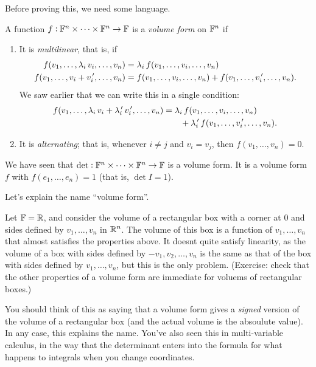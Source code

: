 Before proving this, we need some language.

\begin{definition}
	A function $f:\mathbb{F}^n\times\cdots\times\mathbb{F}^n\to\mathbb{F}$ is a \emph{volume form} on $\mathbb{F}^n$ if
	\begin{enumerate}
		\item It is \emph{multilinear}, that is, if
		\begin{align*}
			f(v_1,\ldots,\lambda_i\,v_i,\ldots,v_n)
			&= \lambda_i\,f(v_1,\ldots,v_i,\ldots,v_n) \\
			f(v_1,\ldots,v_i+v_i^{\,\prime},\ldots,v_n)
			&= f(v_1,\ldots,v_i,\ldots,v_n)
			 + f(v_1,\ldots,v_i^{\,\prime},\ldots,v_n).
		\end{align*}
		We saw earlier that we can write this in a single condition:
		\begin{align*}
			f(v_1,\ldots,\lambda_i\,v_i + \lambda_i\p\,v_i\p,\ldots,v_n)
			&= \lambda_i\,f(v_1,\ldots,v_i,\ldots,v_n) \\
			&\qquad + \lambda_i\p \, f(v_1,\ldots,v_i\p,\ldots,v_n). %
		\end{align*}
		
		\item It is \emph{alternating}; that is, whenever $i\neq j$ and $v_i=v_j$, then $f(v_1,\ldots,v_n)=0$. %
	\end{enumerate}
\end{definition}

\begin{example}
	We have seen that $\det:\mathbb{F}^n\times\cdots\times\mathbb{F}^n \to \mathbb{F}$ is a volume form. It is a volume form $f$ with $f(e_1,\ldots,e_n)=1$ (that is, $\det I=1$). %
\end{example}

\begin{remark}
	Let's explain the name ``volume form''.

	Let $\mathbb{F} = \mathbb{R}$, and consider the volume of a rectangular box with a corner at $0$ and sides defined by $v_1, \dots, v_n$ in $\mathbb{R}^n$. The volume of this box is a function of $v_1,\dots,v_n$ that almost satisfies the properties above. It doesnt quite satisfy linearity, as the volume of a box with sides defined by $-v_1,v_2,\dots,v_n$ is the same as that of the box with sides defined by $v_1, \dots, v_n$, but this is the only problem. (Exercise: check that the other properties of a volume form are immediate for voluems of rectangular boxes.)

	You should think of this as saying that a volume form gives a \emph{signed} version of the volume of a rectangular box (and the actual volume is the absoulute value). In any case, this explains the name. You've also seen this in multi-variable calculus, in the way that the determinant enters into the formula for what happens to integrals when you change coordinates.
\end{remark}

